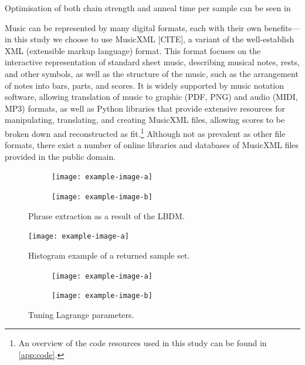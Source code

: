 \documentclass[12pt]{article}
\theoremstyle{definition}
\begin{document}
Optimisation of both chain strength and anneal time per sample can be seen in 

Music can be represented by many digital formats, each with their own benefits---in this study we choose to use MusicXML [CITE], a variant of the well-establish XML (extensible markup language) format. This format focuses on the interactive representation of standard sheet music, describing musical notes, rests, and other symbols, as well as the structure of the music, such as the arrangement of notes into bars, parts, and scores. It is widely supported by music notation software, allowing translation of music to graphic (PDF, PNG) and audio (MIDI, MP3) formats, as well as Python libraries that provide extensive resources for manipulating, translating, and creating MusicXML files, allowing scores to be broken down and reconstructed as fit.\footnote{An overview of the code resources used in this study can be found in \cref{app:code}.} Although not as prevalent as other file formats, there exist a number of online libraries and databases of MusicXML files provided in the public domain.

\begin{figure}
    \begin{subfigure}{0.5\textwidth}
        \texttt{[image: example-image-a]}
        \caption{}
    \end{subfigure}\hfill
    \begin{subfigure}{0.5\textwidth}
        \texttt{[image: example-image-b]}
        \caption{}
    \end{subfigure}
    \caption{Phrase extraction as a result of the LBDM.}
    \label{fig:phrase-extraction}
\end{figure}

\begin{figure}
    \texttt{[image: example-image-a]}
    \caption{Histogram example of a returned sample set.}
    \label{fig:histogram}
\end{figure}

\begin{figure}
    \begin{subfigure}{0.5\textwidth}
        \texttt{[image: example-image-a]}
        \caption{}
    \end{subfigure}\hfill
    \begin{subfigure}{0.5\textwidth}
        \texttt{[image: example-image-b]}
        \caption{}
    \end{subfigure}
    \caption{Tuning Lagrange parameters.}
    \label{fig:lagrange}
\end{figure}
\end{document}
